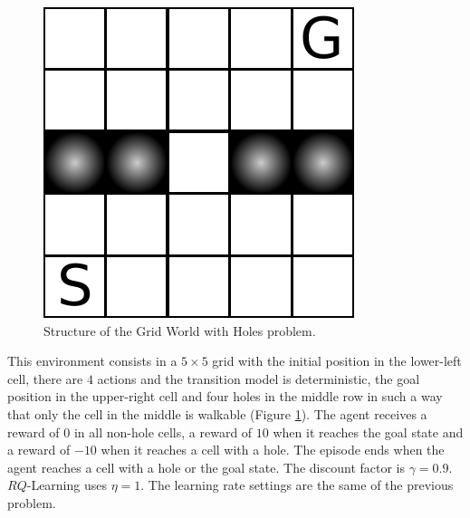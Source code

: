 \begin{figure}[t]
\centering
\includegraphics[scale=.55]{./img/gridhole.pdf}
\caption[Structure of the Grid World with Holes problem.]{Structure of the Grid World with Holes problem.}
  \label{F:grid_hole_map}
\end{figure}
This environment consists in a $5 \times 5$ grid with the initial position in the lower-left cell, there are $4$ actions and the transition model is deterministic, the goal position in the upper-right cell and four holes in the middle row in such a way that only the cell in the middle is walkable (Figure \ref{F:grid_hole_map}). The agent receives a reward of $0$ in all non-hole cells, a reward of $10$ when it reaches the goal state and a reward of $-10$ when it reaches a cell with a hole. The episode ends when the agent reaches a cell with a hole or the goal state. The discount factor is $\gamma = 0.9$. $RQ$-Learning uses $\eta = 1$.
The learning rate settings are the same of the previous problem.

